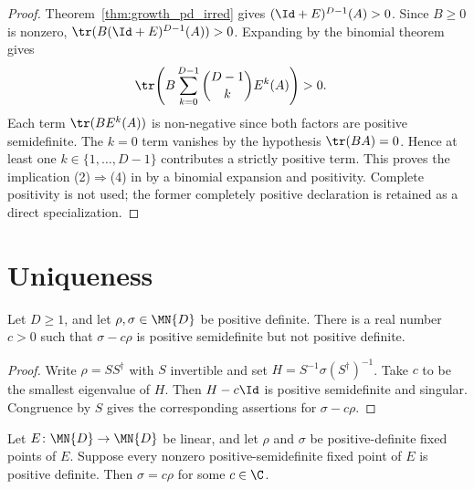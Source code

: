 \begin{proof}
    \leanok
    Theorem~\ref{thm:growth_pd_irred} gives
    $(\Id + E)^{D-1}(A) > 0$.
    Since $B \ge 0$ is nonzero,
    $\tr(B(\Id + E)^{D-1}(A)) > 0$.
    Expanding by the binomial theorem gives
    \begin{align}
        \tr\!\left(B\sum_{k=0}^{D-1}\binom{D-1}{k}E^k(A)\right)
         & > 0.
        \notag
    \end{align}
    Each term $\tr(BE^k(A))$ is non-negative since both factors are
    positive semidefinite.
    The $k = 0$ term vanishes by the hypothesis $\tr(BA) = 0$.
    Hence at least one $k \in \{1,\ldots,D-1\}$ contributes
    a strictly positive term.
    This proves the implication (2)$\Rightarrow$(4) in
    \cite[Theorem~6.2(4)]{Wolf2012Quantum} by a binomial expansion and
    positivity. Complete positivity is not used; the former completely
    positive declaration is retained as a direct specialization.
\end{proof}

\section{Uniqueness}

\begin{lemma}
    \label{lem:critical_scalar_posdef}
    \leanok
    Let $D\geq1$, and let $\rho,\sigma\in\MN{D}$ be positive definite. There
    is a real number $c>0$ such that $\sigma-c\rho$ is positive semidefinite
    but not positive definite.
\end{lemma}

\begin{proof}\leanok
    Write $\rho=SS^\dagger$ with $S$ invertible and set
    $H=S^{-1}\sigma(S^\dagger)^{-1}$. Take $c$ to be the smallest eigenvalue
    of $H$. Then $H-c\Id$ is positive semidefinite and singular. Congruence by
    $S$ gives the corresponding assertions for $\sigma-c\rho$.
\end{proof}

\begin{theorem}
    \label{thm:posdef_fixedpoint_proportional}
    \leanok
    Let $E\colon\MN{D}\to\MN{D}$ be linear, and let $\rho$ and $\sigma$ be
    positive-definite fixed points of $E$. Suppose every nonzero
    positive-semidefinite fixed point of $E$ is positive definite. Then
    $\sigma=c\rho$ for some $c\in\C$.
\end{theorem}

